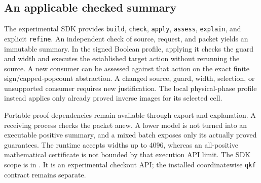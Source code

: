 \subsection{An applicable checked summary}
The experimental SDK provides \texttt{build}, \texttt{check}, \texttt{apply}, \texttt{assess}, \texttt{explain}, and explicit \texttt{refine}. An independent check of source, request, and packet yields an immutable summary. In the signed Boolean profile, applying it checks the guard and width and executes the established target action without rerunning the source. A new consumer can be assessed against that action on the exact finite sign/capped-popcount abstraction. A changed source, guard, width, selection, or unsupported consumer requires new justification. The local physical-phase profile instead applies only already proved inverse images for its selected cell.

Portable proof dependencies remain available through export and explanation. A receiving process checks the packet anew. A lower model is not turned into an executable positive summary, and a mixed batch exposes only its actually proved guarantees. The runtime accepts widths up to 4096, whereas an all-positive mathematical certificate is not bounded by that execution API limit. The SDK scope is in . It is an experimental checkout API; the installed coordinatewise \texttt{qkf} contract remains separate.
